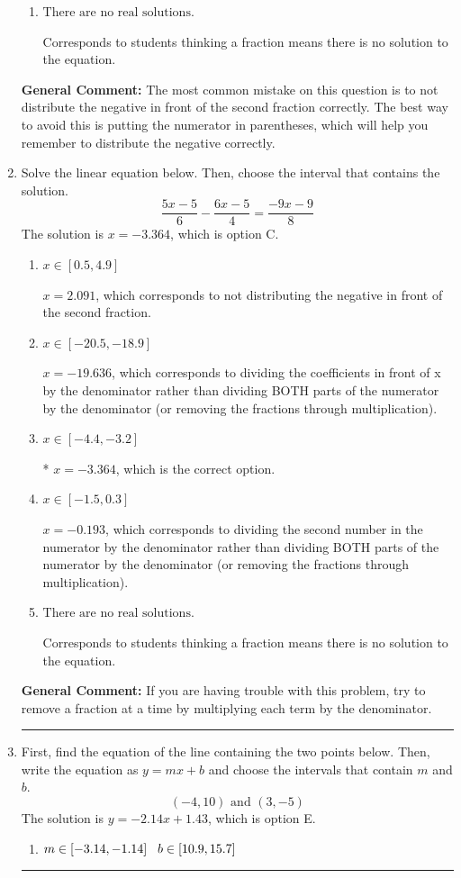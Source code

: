 \documentclass{extbook}[14pt]
\newcommand{\litem}[1]{\item #1

\rule{\textwidth}{0.4pt}}
\begin{document}
\begin{enumerate}
{\begin{enumerate}[label=\Alph*.]
$x = 0.613$, which corresponds to not distributing the negative in front of the second parentheses correctly.
\item \( \text{There are no real solutions.} \)

Corresponds to students thinking a fraction means there is no solution to the equation.
\end{enumerate}

\textbf{General Comment:} The most common mistake on this question is to not distribute the negative in front of the second fraction correctly. The best way to avoid this is putting the numerator in parentheses, which will help you remember to distribute the negative correctly.
}
\litem{
Solve the linear equation below. Then, choose the interval that contains the solution.
\[ \frac{5x -5}{6} - \frac{6x -5}{4} = \frac{-9x -9}{8} \]The solution is \( x = -3.364 \), which is option C.\begin{enumerate}[label=\Alph*.]
\item \( x \in [0.5, 4.9] \)

 $x = 2.091$, which corresponds to not distributing the negative in front of the second fraction.
\item \( x \in [-20.5, -18.9] \)

 $x = -19.636$, which corresponds to dividing the coefficients in front of x by the denominator rather than dividing BOTH parts of the numerator by the denominator (or removing the fractions through multiplication).
\item \( x \in [-4.4, -3.2] \)

* $x = -3.364$, which is the correct option.
\item \( x \in [-1.5, 0.3] \)

 $x = -0.193$, which corresponds to dividing the second number in the numerator by the denominator rather than dividing BOTH parts of the numerator by the denominator (or removing the fractions through multiplication).
\item \( \text{There are no real solutions.} \)

Corresponds to students thinking a fraction means there is no solution to the equation.
\end{enumerate}

\textbf{General Comment:} If you are having trouble with this problem, try to remove a fraction at a time by multiplying each term by the denominator.
}
\litem{
First, find the equation of the line containing the two points below. Then, write the equation as $ y=mx+b $ and choose the intervals that contain $m$ and $b$.
\[ (-4, 10) \text{ and } (3, -5) \]The solution is \( y = -2.14x + 1.43 \), which is option E.\begin{enumerate}[label=\Alph*.]
\item \( m \in [-3.14, -1.14] \hspace*{3mm} b \in [10.9, 15.7] \)


\end{enumerate}}
\end{enumerate}
\end{document}
